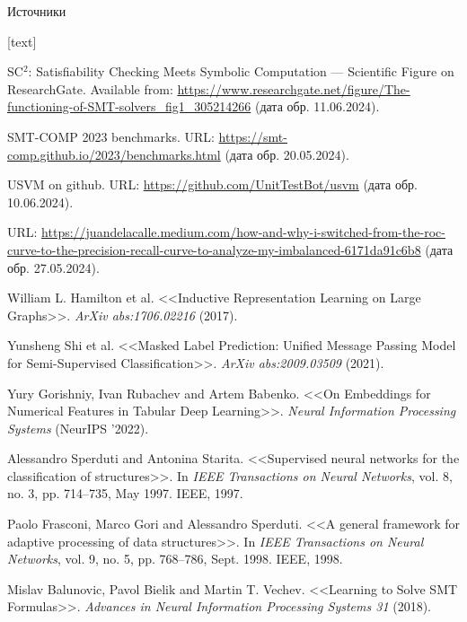 \documentclass[14pt,aspectratio=169,hyperref={pdftex,unicode},xcolor=dvipsnames]{beamer}
\begin{document}
\begin{frame}{Источники}

\begin{thebibliography}{1}

[text]

 SC$^{\text{2}}$: Satisfiability Checking Meets Symbolic Computation --- Scientific Figure on ResearchGate. Available from: \url{https://www.researchgate.net/figure/The-functioning-of-SMT-solvers_fig1_305214266} (дата обр. 11.06.2024).

 SMT-COMP 2023 benchmarks. URL: \url{https://smt-comp.github.io/2023/benchmarks.html} (дата обр. 20.05.2024).

 USVM on github. URL: \url{https://github.com/UnitTestBot/usvm} (дата обр. 10.06.2024).

 URL: \url{https://juandelacalle.medium.com/how-and-why-i-switched-from-the-roc-curve-to-the-precision-recall-curve-to-analyze-my-imbalanced-6171da91c6b8} (дата обр. 27.05.2024).

 William L. Hamilton et al. <<Inductive Representation Learning on Large Graphs>>.  \textit{ArXiv abs:1706.02216} (2017).

 Yunsheng Shi et al. <<Masked Label Prediction: Unified Message Passing Model for Semi-Supervised Classification>>. \textit{ArXiv abs:2009.03509} (2021).

 Yury Gorishniy, Ivan Rubachev and Artem Babenko. <<On Embeddings for Numerical Features in Tabular Deep Learning>>. \textit{Neural Information Processing Systems} (NeurIPS '2022).

 Alessandro Sperduti and Antonina Starita. <<Supervised neural networks for the classification of structures>>. In \textit{IEEE Transactions on Neural Networks}, vol. 8, no. 3, pp. 714--735, May 1997. IEEE, 1997.

 Paolo Frasconi, Marco Gori and Alessandro Sperduti. <<A general framework for adaptive processing of data structures>>. In \textit{IEEE Transactions on Neural Networks}, vol. 9, no. 5, pp. 768--786, Sept. 1998. IEEE, 1998.

 Mislav Balunovic, Pavol Bielik and Martin T. Vechev. <<Learning to Solve SMT Formulas>>. \textit{Advances in Neural Information Processing Systems 31} (2018).


\end{thebibliography}
\end{frame}
\end{document}
